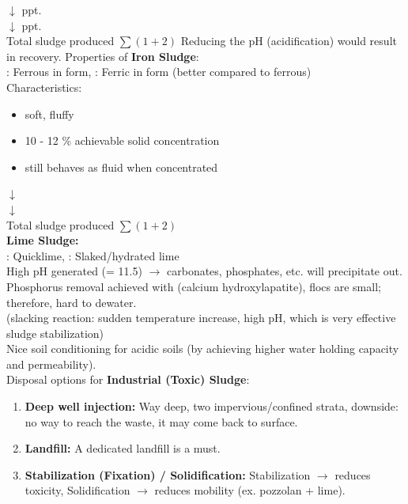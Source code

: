 \documentclass[12pt]{article}
\begin{document}
 $\downarrow$ ppt.\\
 $\downarrow$ ppt.\\
Total sludge produced $\sum (1 + 2)$
Reducing the pH (acidification) would result in  recovery.
Properties of \textbf{Iron Sludge}:\\
: Ferrous in  form, : Ferric in  form (better compared to ferrous)\\
Characteristics:
\begin{itemize}
    \item soft, fluffy
    \item 10 - 12 \% achievable solid concentration
    \item still behaves as fluid when concentrated
\end{itemize}
 $\downarrow$\\
 $\downarrow$\\
Total sludge produced $\sum (1 + 2)$\\
\textbf{Lime Sludge:}\\
: Quicklime, : Slaked/hydrated lime\\
High pH generated (= 11.5) $\rightarrow$ carbonates, phosphates, etc. will precipitate out.\\
Phosphorus removal achieved with  (calcium hydroxylapatite), flocs are small; therefore, hard to dewater.\\
 (slacking reaction: sudden temperature increase, high pH, which is very effective sludge stabilization)\\
Nice soil conditioning for acidic soils (by achieving higher water holding capacity and permeability).\\
Disposal options for \textbf{Industrial (Toxic) Sludge}:
\begin{enumerate}
    \item \textbf{Deep well injection:} Way deep, two impervious/confined strata, downside: no way to reach the waste, it may come back to surface.
     \item \textbf{Landfill:} A dedicated landfill is a must.
     \item \textbf{Stabilization (Fixation) / Solidification:} Stabilization $\rightarrow$ reduces toxicity, Solidification $\rightarrow$ reduces mobility (ex. pozzolan + lime).
\end{enumerate}
\end{document}
